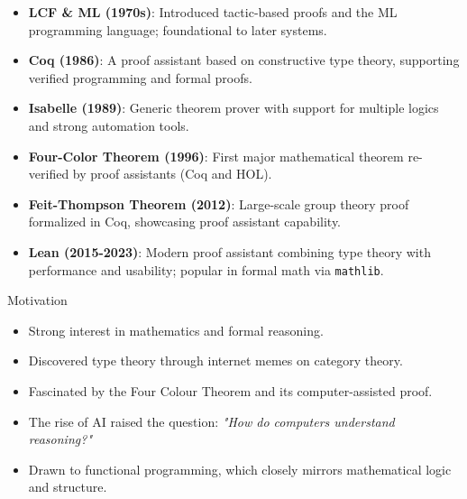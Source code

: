 \documentclass{beamer}
\begin{document}
\begin{frame}

\begin{itemize}
   \item \textbf{LCF \& ML (1970s)}: Introduced tactic-based proofs and the ML programming language; foundational to later systems.
  
  \item \textbf{Coq (1986)}: A proof assistant based on constructive type theory, supporting verified programming and formal proofs.
  
  \item \textbf{Isabelle (1989)}: Generic theorem prover with support for multiple logics and strong automation tools.

  \item \textbf{Four-Color Theorem (1996)}: First major mathematical theorem re-verified by proof assistants (Coq and HOL).
  
  \item \textbf{Feit-Thompson Theorem (2012)}: Large-scale group theory proof formalized in Coq, showcasing proof assistant capability.
  
  \item \textbf{Lean (2015-2023)}: Modern proof assistant combining type theory with performance and usability; popular in formal math via \texttt{mathlib}.
  
\end{itemize}
\end{frame}
\begin{frame}{Motivation}
    \begin{itemize}
  \item Strong interest in mathematics and formal reasoning.
  \item Discovered type theory through internet memes on category theory.
  \item Fascinated by the Four Colour Theorem and its computer-assisted proof.
  \item The rise of AI raised the question: \textit{"How do computers understand reasoning?"}
  \item Drawn to functional programming, which closely mirrors mathematical logic and structure.
    
\end{itemize}

\end{frame}
\end{document}
